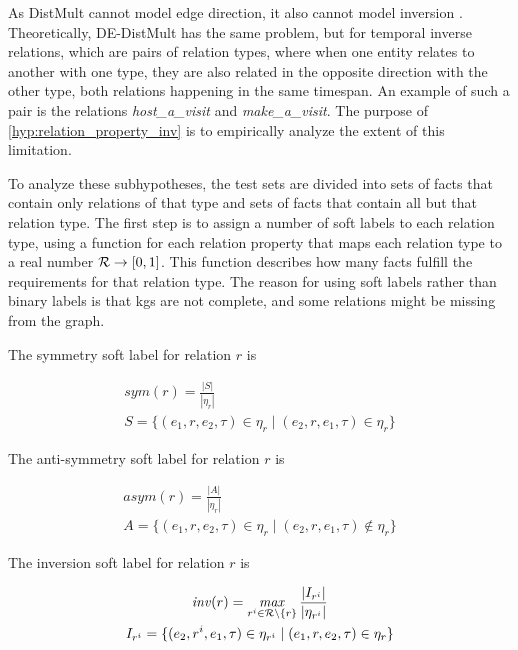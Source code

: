 As DistMult cannot model edge direction, it also cannot model inversion \cite{goel19diachronicemb}. Theoretically, DE-DistMult has the same problem, but for temporal inverse relations, which are pairs of relation types, where when one entity relates to another with one type, they are also related in the opposite direction with the other type, both relations happening in the same timespan. An example of such a pair is the relations \textit{host\_a\_visit} and \textit{make\_a\_visit}. The purpose of \autoref{hyp:relation_property_inv} is to empirically analyze the extent of this limitation.

To analyze these subhypotheses, the test sets are divided into sets of facts that contain only relations of that type and sets of facts that contain all but that relation type. The first step is to assign a number of soft labels to each relation type, using a function for each relation property that maps each relation type to a real number $\mathcal{R} \rightarrow [ 0 , 1 ]$. This function describes how many facts fulfill the requirements for that relation type. The reason for using soft labels rather than binary labels is that \glspl{kg} are not complete, and some relations might be missing from the graph.

The symmetry soft label for relation $r$ is

\begin{equation}
\begin{gathered}
\mathit{sym}(r) = \frac{|S|}{|\eta_r|}\\
S = \{ (e_1, r, e_2, \tau) \in \eta_r \mid (e_2, r, e_1, \tau) \in \eta_r \}
\end{gathered}
\end{equation}

\noindent
The anti-symmetry soft label for relation $r$ is

\begin{equation}
\begin{gathered}
\mathit{asym}(r) = \frac{|A|}{|\eta_r|}\\
A = \{ (e_1, r, e_2, \tau) \in \eta_r \mid (e_2, r, e_1, \tau) \notin \eta_r \}
\end{gathered}
\end{equation}

\noindent
The inversion soft label for relation $r$ is

\begin{equation}
\begin{gathered}
\mathit{inv}(r) = \operatorname*{\mathit{max}}\limits_{r^i \in \mathcal{R} \setminus \{r\} } \frac{|I_{r^i}|}{|\eta_{r^i}|}\\
I_{r^i} = \{ (e_2, r^i, e_1, \tau) \in \eta_{r^i}  \mid (e_1, r, e_2, \tau) \in \eta_r \}
\end{gathered}
\end{equation}

